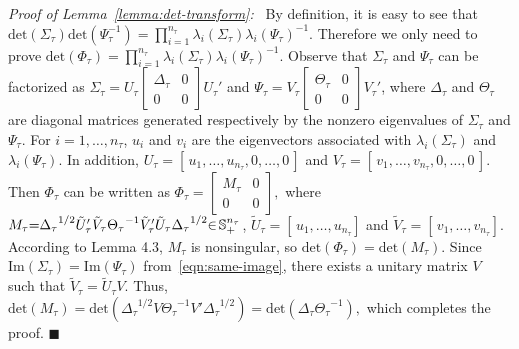 \documentclass[twocolumn]{autart}    \usepackage{cite}
\begin{document}
{{\textit{Proof of Lemma~\ref{lemma:det-transform}:~}
By definition, it is easy to see that
$\mathrm{det}(\Sigma_\tau)\mathrm{det}
(\Psi_\tau^{-1})=\prod_{i=1}^{n_\tau}
\lambda_i(\Sigma_\tau){\lambda_i(\Psi_\tau)}^{-1}.$
Therefore we only need to prove
$\mathrm{det}(\Phi_\tau)=\prod_{i=1}^{n_\tau}
\lambda_i(\Sigma_\tau){\lambda_i
(\Psi_\tau)}^{-1}.$
Observe that
$\Sigma_\tau$ and $\Psi_\tau$ can be factorized
as
$\Sigma_\tau=U_\tau \left[
\begin{array}{cc}
\Delta_\tau & 0\\
0 &0\end{array}\right]{U_\tau}'$ and
$\Psi_\tau=V_\tau \left[
\begin{array}{cc}
\Theta_\tau & 0\\
0&0\end{array}\right]{V_\tau}'$,
where
$\Delta_\tau$ and $\Theta_\tau$
are diagonal matrices generated
respectively
by the nonzero eigenvalues of $\Sigma_\tau$ and
$\Psi_\tau$. For $i=1,\ldots, n_\tau$,
$u_i$ and $v_i$ are the eigenvectors
associated with
$\lambda_i(\Sigma_\tau)$ and
$\lambda_i(\Psi_\tau)$. In addition,
$U_\tau=[\,{u}_1,\ldots,
{u}_{n_\tau},{0},\ldots,
{0}\,]$
and $V_\tau=[\,{v}_1,\ldots,
{v}_{n_\tau},{0},\ldots,
{0}\,]$. Then $\Phi_\tau$ can be
written as
$
\Phi_\tau=\left[
\begin{array}{cc}
M_\tau & 0\\
0&0
\end{array}\right],
$
where $M_\tau\hspace{-1mm}=\hspace{-1mm}{\Delta_\tau}^{1/2}
{\tilde{U}_\tau}'
\tilde{V}_\tau
{\Theta_\tau}^{-1}
{\tilde{V}_\tau}'
\tilde{U}_\tau
{\Delta_\tau}^{1/2}\hspace{-1mm}\in \hspace{-0.5mm}\mathbb{S}_+^{n_\tau}$,
$\tilde{U}_\tau=[\,u_1,\ldots,u_{n_\tau}]$ and
$\tilde{V}_\tau=[\,v_1,\ldots,v_{n_\tau}]$.
According to Lemma 4.3,
$M_\tau$ is nonsingular, so
$\mathrm{det}(\Phi_\tau)=\mathrm{det}
(M_\tau)$.
Since $\mathrm{Im}(\Sigma_\tau)=
\mathrm{Im}(\Psi_\tau)$ from~\eqref{eqn:same-image},
there exists a
unitary matrix $V$ such that $\tilde{V}_\tau=
\tilde{U}_\tau V$. Thus,
$
\mathrm{det}(M_\tau)=\mathrm{det}
\left({\Delta_\tau}^{1/2}V{\Theta_\tau}^{-1}
V'{\Delta_\tau}^{1/2}\right)=\mathrm{det}
\left(
{\Delta_\tau}{\Theta_\tau}^{-1}\right),
$
which completes the proof. \hfill $\blacksquare$

}}
\end{document}
